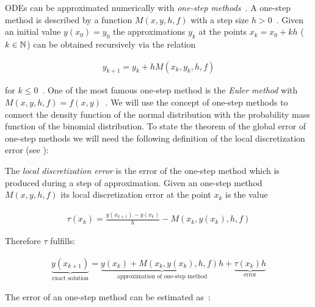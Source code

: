 ODEs can be approximated numerically with \emph{one-step methods}~\cite[pp.~471~ff]{stoer}. A one-step method is described by a function $M(x,y,h,f)$ with a step size $h>0$~\cite[p.~473]{stoer}. Given an initial value $y(x_0)=y_0$ the approximations $y_k$ at the points $x_k = x_0 + kh$ ($k\in\mathbb N$) can be obtained recursively via the relation

\begin{align}
  y_{k+1} = y_k + h M(x_k, y_k, h, f)
\end{align}

for $k \le 0$~\cite[p. 473]{stoer}. One of the most famous one-step method is the \emph{Euler method} with $M(x,y,h,f) = f(x,y)$~\cite[p. 473]{stoer}. We will use the concept of one-step methods to connect the density function of the normal distribution with the probability mass function of the binomial distribution. To state the theorem of the global error of one-step methods we will need the following definition of the local discretization error (see \cite[pp. 473-474]{stoer}):

\begin{definition}
  The \emph{local discretization error} is the error of the one-step method which is produced during a step of approximation. Given an one-step method $M(x,y,h,f)$ its local discretization error at the point $x_k$ is the value

  \begin{align}
    \tau(x_k) = \frac{y(x_{k+1})-y(x_k)}h - M(x_k,y(x_k),h,f)
  \end{align}
\end{definition}

\noindent Therefore $\tau$ fulfills:

\begin{align}
  \underbrace{y(x_{k+1})}_{\text{exact solution}} = \underbrace{y(x_k) + M(x_k,y(x_k),h,f)h}_{\text{approximation of one-step method}} + \underbrace{\tau(x_k)h}_{\text{error}}
\end{align}

\noindent The error of an one-step method can be estimated as~\cite[pp. 478-479]{stoer}:

